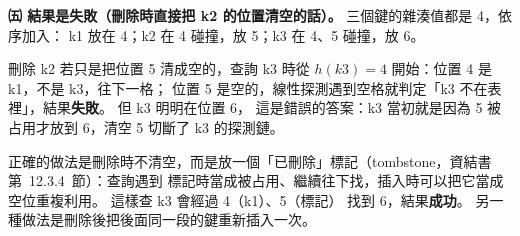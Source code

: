 \begin{pastsoln}
\textbf{㈤ 結果是失敗（刪除時直接把 k2 的位置清空的話）。} 三個鍵的雜湊值都是 4，依序加入：
k1 放在 4；k2 在 4 碰撞，放 5；k3 在 4、5 碰撞，放 6。
\begin{center}
\end{center}
刪除 k2 若只是把位置 5 清成空的，查詢 k3 時從 $h(k3) = 4$ 開始：位置 4 是 k1，不是 k3，往下一格；
位置 5 是空的，線性探測遇到空格就判定「k3 不在表裡」，結果\textbf{失敗}。 但 k3 明明在位置 6，
這是錯誤的答案：k3 當初就是因為 5 被占用才放到 6，清空 5 切斷了 k3 的探測鏈。

正確的做法是刪除時不清空，而是放一個「已刪除」標記（tombstone，資結書第~12.3.4~節）：查詢遇到
標記時當成被占用、繼續往下找，插入時可以把它當成空位重複利用。 這樣查 k3 會經過 4（k1）、5（標記）
找到 6，結果\textbf{成功}。 另一種做法是刪除後把後面同一段的鍵重新插入一次。
\end{pastsoln}
